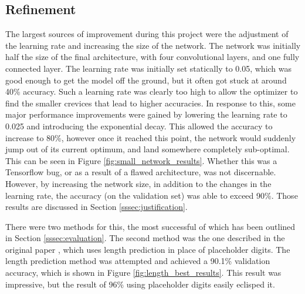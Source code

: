 \documentclass[12pt]{article}
\begin{document}
\subsection{Refinement}
The largest sources of improvement during this project were the adjustment of the learning rate and increasing the size of the network.
The network was initially half the size of the final architecture, with four convolutional layers, and one fully connected layer.
The learning rate was initially set statically to 0.05, which was good enough to get the model off the ground, but it often got stuck at around 40\% accuracy. 
Such a learning rate was clearly too high to allow the optimizer to find the smaller crevices that lead to higher accuracies. 
In response to this, some major performance improvements were gained by lowering the learning rate to 0.025 and introducing the exponential decay.
This allowed the accuracy to increase to 80\%, however once it reached this point, the network would suddenly jump out of its current optimum, and land somewhere completely sub-optimal. 
This can be seen in Figure \ref{fig:small_network_results}.
Whether this was a Tensorflow bug, or as a result of a flawed architecture, was not discernable.
However, by increasing the network size, in addition to the changes in the learning rate, the accuracy (on the validation set) was able to exceed 90\%. 
Those results are discussed in Section \ref{sssec:justification}.

There were two methods for this, the most successful of which has been outlined in Section \ref{sssec:evaluation}.
The second method was the one described in the original paper \cite{svhn_original_paper}, which uses length prediction in place of placeholder digits.
The length prediction method was attempted and achieved a 90.1\% validation accuracy, which is shown in Figure \ref{fig:length_best_results}.
This result was impressive, but the result of 96\% using placeholder digits easily eclisped it.
\end{document}
